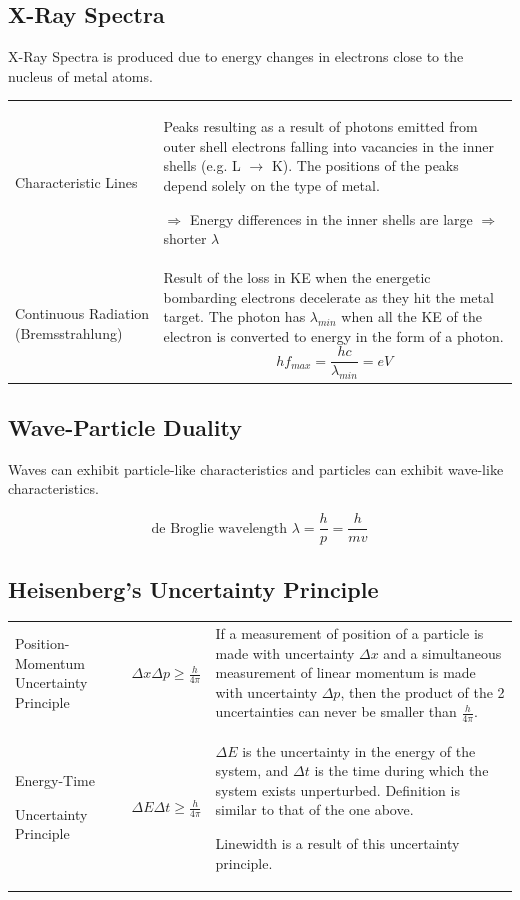 \documentclass[a4paper,11pt]{article}
\begin{document}
		\subsection{X-Ray Spectra}
			X-Ray Spectra is produced due to energy changes in electrons close to the nucleus of metal atoms.
			
			\begin{center}
				\renewcommand{\arraystretch}{1.8}
				\begin{tabular}{@{} p{3.5cm} p{10.5cm} @{}}
					\toprule
					Characteristic Lines & Peaks resulting as a result of photons emitted from outer shell electrons falling into vacancies in the inner shells (e.g. L $\rightarrow$ K). The positions of the peaks depend solely on the type of metal. \par $\Rightarrow$ Energy differences in the inner shells are large $\Rightarrow$ shorter $\lambda$\\
					Continuous Radiation (Bremsstrahlung) & Result of the loss in KE when the energetic bombarding electrons decelerate as they hit the metal target. The photon has $\lambda_{min}$ when all the KE of the electron is converted to energy in the form of a photon. $$hf_{max}=\frac{hc}{\lambda_{min}}=eV$$ \vspace*{-\baselineskip}\\
					\bottomrule
				\end{tabular}
			\end{center}
		\subsection{Wave-Particle Duality}
			Waves can exhibit particle-like characteristics and particles can exhibit wave-like characteristics.
			
			$$\textrm{de Broglie wavelength }\lambda = \frac{h}{p}=\frac{h}{mv}$$
		\subsection{Heisenberg's Uncertainty Principle}
			\begin{center}
				\renewcommand{\arraystretch}{1.8}
				\begin{tabular}{@{} p{3.5cm} l p{8.3cm} @{}}
					\toprule
					Position-Momentum Uncertainty Principle & $\displaystyle \Delta x \Delta p \geq \frac{h}{4\pi}$ & If a measurement of position of a particle is made with uncertainty $\Delta x$ and a simultaneous measurement of linear momentum is made with uncertainty $\Delta p$, then the product of the 2 uncertainties can never be smaller than $\frac{h}{4\pi}$. \\
					Energy-Time \par Uncertainty Principle & $\displaystyle \Delta E \Delta t \geq \frac{h}{4\pi}$ & $\Delta E$ is the uncertainty in the energy of the system, and $\Delta t$ is the time during which the system exists unperturbed. Definition is similar to that of the one above. \par Linewidth is a result of this uncertainty principle. \\
					\bottomrule
				\end{tabular}
			\end{center}
\end{document}
